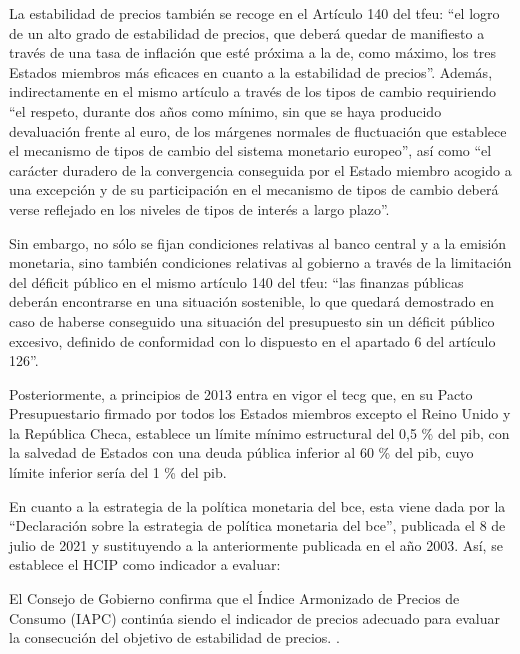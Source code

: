 \documentclass[titlepage, 12pt]{article}
\begin{document}
La estabilidad de precios también se recoge en el Artículo 140 del \acrfull{tfeu}: \enquote{el logro de un alto grado de estabilidad de precios, que deberá quedar de manifiesto a través de una tasa de inflación que esté próxima a la de, como máximo, los tres Estados miembros más eficaces en cuanto a la estabilidad de precios}. Además, indirectamente en el mismo artículo a través de los tipos de cambio requiriendo \enquote{el respeto, durante dos años como mínimo, sin que se haya producido devaluación frente al euro, de los márgenes normales de fluctuación que establece el mecanismo de tipos de cambio del sistema monetario europeo}, así como \enquote{el carácter duradero de la convergencia conseguida por el Estado miembro acogido a una excepción y de su participación en el mecanismo de tipos de cambio deberá verse reflejado en los niveles de tipos de interés a largo plazo}.

Sin embargo, no sólo se fijan condiciones relativas al banco central y a la emisión monetaria, sino también condiciones relativas al gobierno a través de la limitación del déficit público en el mismo artículo 140 del \acrshort{tfeu}: \enquote{las finanzas públicas deberán encontrarse en una situación sostenible, lo que quedará demostrado en caso de haberse conseguido una situación del presupuesto sin un déficit público excesivo, definido de conformidad con lo dispuesto en el apartado 6 del artículo 126}.

Posteriormente, a principios de 2013 entra en vigor el \acrfull{tecg} que, en su Pacto Presupuestario firmado por todos los Estados miembros excepto el Reino Unido y la República Checa, establece un límite mínimo estructural del 0,5 \% del \acrshort{pib}, con la salvedad de Estados con una deuda pública inferior al 60 \% del \acrshort{pib}, cuyo límite inferior sería del 1 \% del \acrshort{pib}.

En cuanto a la estrategia de la política monetaria del \acrfull{bce}, esta viene dada por la \enquote{Declaración sobre la estrategia de política monetaria del \acrshort{bce}}, publicada el 8 de julio de 2021 y sustituyendo a la anteriormente publicada en el año 2003. Así, se establece el HCIP como indicador a evaluar:

\begin{displayquote}
    El Consejo de Gobierno confirma que el Índice Armonizado de Precios de Consumo (IAPC) continúa siendo el indicador de precios adecuado para evaluar la consecución del objetivo de estabilidad de precios. \autocite{ecb2021}.
\end{displayquote}
\end{document}
